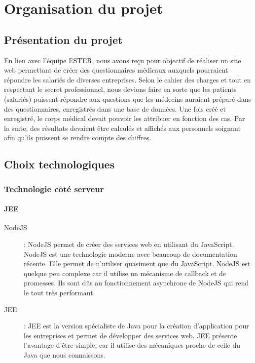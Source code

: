 \chapter{Organisation du projet}

\section{Présentation du projet}

En lien avec l'équipe ESTER, nous avons reçu pour objectif de réaliser un site web permettant de créer des questionnaires médicaux auxquels pourraient répondre les salariés de diverses entreprises. Selon le cahier des charges et tout en respectant le secret professionnel, nous devions faire en sorte que les patients (salariés) puissent répondre aux questions que les médecins auraient préparé dans des questionnaires, enregistrés dans une base de données. Une fois créé et enregistré, le corps médical devait pouvoir les attribuer en fonction des cas. Par la suite, des résultats devaient être calculés et affichés aux personnels soignant afin qu'ils puissent se rendre compte des chiffres. 

\section{Choix technologiques}

\subsection{Technologie côté serveur}

\subsubsection{JEE}

\begin{description}

\item[NodeJS] : NodeJS permet de créer des services web en utilisant du JavaScript. 
NodeJS est une technologie moderne avec beaucoup de documentation récente. Elle permet de n'utiliser quasiment que du JavaScript. NodeJS est quelque peu complexe car il utilise un mécanisme de callback et de promesses. Ils sont dûs au fonctionnement asynchrone de NodeJS qui rend le tout très performant.

\item[JEE] : JEE est la version spécialiste de Java pour la création d'application pour les entreprises et permet de développer des services web.
JEE présente l'avantage d'être simple, car il utilise des mécaniques proche de celle du Java que nous connaissons. 

\end{description}

